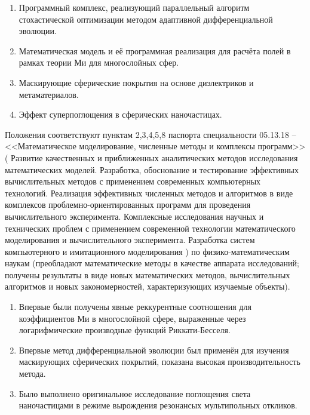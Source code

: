 \begin{enumerate}
\item Программный комплекс, реализующий параллельный алгоритм
  стохастической оптимизации методом адаптивной дифференциальной
  эволюции.
\item Математическая модель и её программная реализация для расчёта
  полей в рамках теории Ми для многослойных сфер.
\item Маскирующие сферические покрытия на основе диэлектриков и метаматериалов.
\item Эффект суперпоглощения в сферических наночастицах.
\end{enumerate}
Положения соответствуют пунктам 2,3,4,5,8 паспорта специальности
05.13.18 -- <<Математическое моделирование, численные методы и
комплексы программ>> (%
Развитие качественных и приближенных аналитических методов
исследования математических моделей.
Разработка, обоснование и тестирование эффективных вычислительных
методов с применением современных компьютерных технологий.
Реализация эффективных численных методов и алгоритмов в виде
комплексов проблемно-ориентированных программ для проведения
вычислительного эксперимента.
Комплексные исследования научных и технических проблем с
применением современной технологии математического моделирования и
вычислительного эксперимента.
Разработка систем компьютерного и имитационного моделирования%
) по физико-математическим наукам (преобладают математические методы в
качестве аппарата исследований; получены результаты в виде новых
математических методов, вычислительных алгоритмов и новых
закономерностей, характеризующих изучаемые объекты).  \novelty
\begin{enumerate}
  \item Впервые были получены явные реккурентные соотношения для
    коэффициентов Ми в многослойной сфере, выраженные через
    логарифмические производные функций Риккати-Бесселя. 
  \item Впервые метод дифференциальной эволюции был применён
    для изучения маскирующих сферических покрытий, показана высокая
    производительность метода.
  \item Было выполнено оригинальное исследование поглощения света
    наночастицами в режиме вырождения резонансых мультипольных откликов.
\end{enumerate}

